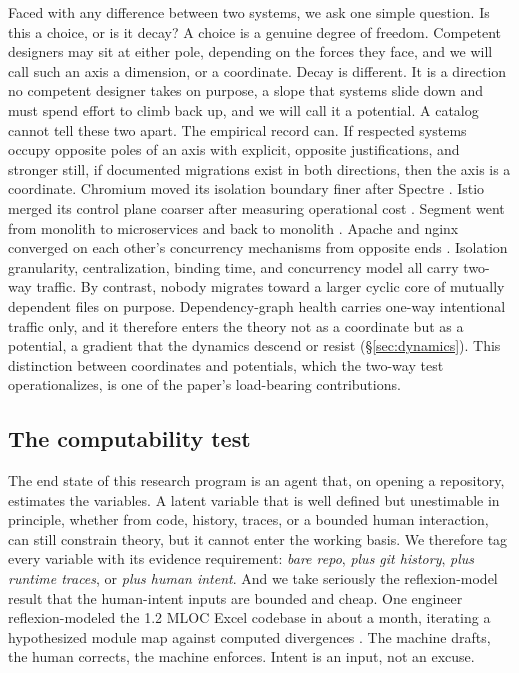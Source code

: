 \documentclass[11pt,oneside]{article}
\theoremstyle{definition}
\begin{document}
Faced with any difference between two systems, we ask one simple question. Is this a choice, or
is it decay? A choice is a genuine degree of freedom. Competent designers may sit at either
pole, depending on the forces they face, and we will call such an axis a dimension, or a
coordinate. Decay is different. It is a direction no competent designer takes on purpose, a
slope that systems slide down and must spend effort to climb back up, and we will call it a
potential. A catalog cannot tell these two apart. The empirical record can. If respected
systems occupy opposite poles of an axis with explicit, opposite justifications, and stronger
still, if documented migrations exist in both directions, then the axis is a coordinate. Chromium moved its isolation boundary finer after Spectre
\cite{chromium2009,reis2019}. Istio merged its control plane coarser after measuring operational
cost \cite{istio2020}. Segment went from monolith to microservices and back to monolith
\cite{segment2018}. Apache and nginx converged on each other's concurrency mechanisms from
opposite ends \cite{aosanginx}. Isolation granularity, centralization, binding time, and
concurrency model all carry two-way traffic. By contrast, nobody migrates toward a larger cyclic
core of mutually dependent files on purpose. Dependency-graph health carries one-way intentional
traffic only, and it therefore enters the theory not as a coordinate but as a potential, a
gradient that the dynamics descend or resist (\S\ref{sec:dynamics}). This distinction between
coordinates and potentials, which the two-way test operationalizes, is one of the paper's
load-bearing contributions.

\subsection{The computability test}

The end state of this research program is an agent that, on opening a repository, estimates the
variables. A latent variable that is well defined but unestimable in principle, whether from
code, history, traces, or a bounded human interaction, can still constrain theory, but it cannot
enter the working basis. We therefore tag every variable with its evidence requirement:
\emph{bare repo}, \emph{plus git history}, \emph{plus runtime traces}, or \emph{plus human
intent}. And we take seriously the reflexion-model result that the human-intent inputs are
bounded and cheap. One engineer reflexion-modeled the 1.2 MLOC Excel codebase in about a month,
iterating a hypothesized module map against computed divergences \cite{murphy1995}. The machine
drafts, the human corrects, the machine enforces. Intent is an input, not an excuse.
\end{document}
